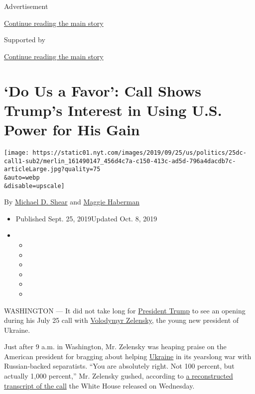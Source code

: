 Advertisement

\protect\hyperlink{after-top}{Continue reading the main story}

Supported by

\protect\hyperlink{after-sponsor}{Continue reading the main story}

\hypertarget{do-us-a-favor-call-shows-trumps-interest-in-using-us-power-for-his-gain}{%
\section{`Do Us a Favor': Call Shows Trump's Interest in Using U.S.
Power for His
Gain}\label{do-us-a-favor-call-shows-trumps-interest-in-using-us-power-for-his-gain}}

\texttt{[image: https://static01.nyt.com/images/2019/09/25/us/politics/25dc-call1-sub2/merlin\_161490147\_456d4c7a-c150-413c-ad5d-796a4dacdb7c-articleLarge.jpg?quality=75\\\&auto=webp\\\&disable=upscale]}

By \href{https://www.nytimes.com/by/michael-d-shear}{Michael D. Shear}
and \href{https://www.nytimes.com/by/maggie-haberman}{Maggie Haberman}

\begin{itemize}
\item
  Published Sept. 25, 2019Updated Oct. 8, 2019
\item
  \begin{itemize}
  \item
  \item
  \item
  \item
  \item
  \item
  \end{itemize}
\end{itemize}

WASHINGTON --- It did not take long for
\href{https://www.nytimes.com/2019/10/08/us/politics/sondland-trump-ukraine-impeach.html}{President
Trump} to see an opening during his July 25 call with
\href{https://www.nytimes.com/2019/10/08/us/politics/sondland-trump-ukraine-impeach.html}{Volodymyr
Zelensky}, the young new president of Ukraine.

Just after 9 a.m. in Washington, Mr. Zelensky was heaping praise on the
American president for bragging about helping
\href{https://www.nytimes.com/2019/10/08/us/politics/sondland-trump-ukraine-impeach.html}{Ukraine}
in its yearslong war with Russian-backed separatists. ``You are
absolutely right. Not 100 percent, but actually 1,000 percent,'' Mr.
Zelensky gushed, according to
\href{https://www.nytimes.com/interactive/2019/09/25/us/politics/trump-ukraine-transcript.html}{a
reconstructed transcript of the call} the White House released on
Wednesday.

